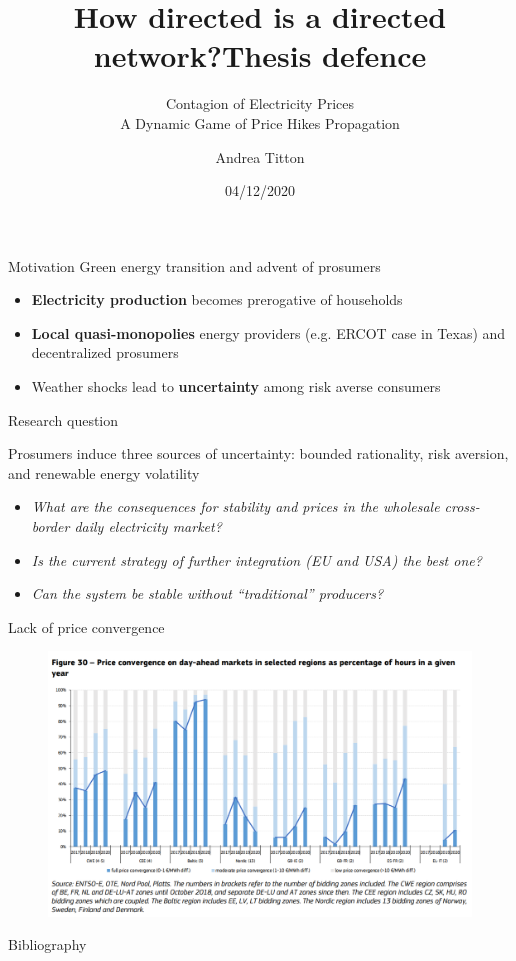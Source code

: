 \documentclass{beamer}
\title{How directed is a directed network?}
\author{Andrea Titton}
\title{Thesis defence}
\subtitle{Contagion of Electricity Prices \\ A Dynamic Game of Price Hikes Propagation}
\institute{Tinbergen Institute}
\date{04/12/2020}
\begin{document}
\frame{\titlepage}

\begin{frame}{Motivation}
    Green energy transition and advent of prosumers
    \vspace{2em}
    \begin{itemize}\setlength\itemsep{1.5em}
        \item \textbf{Electricity production} becomes prerogative of households
        \item \textbf{Local quasi-monopolies} energy providers (e.g. ERCOT case in Texas) and decentralized prosumers
        \item Weather shocks lead to \textbf{uncertainty} among risk averse consumers
    \end{itemize}
\end{frame}

\begin{frame}{Research question}

    Prosumers induce three sources of uncertainty: bounded rationality, risk aversion, and renewable energy volatility

    \begin{itemize} \setlength{\itemsep}{1em}
        \item \textit{What are the consequences for stability and prices in the wholesale cross-border daily electricity market?}
        \item \textit{Is the current strategy of further integration (EU and USA) the best one?}
        \item \textit{Can the system be stable without ``traditional'' producers?}
    \end{itemize}

\end{frame}

\begin{frame}{Lack of price convergence}
    \begin{figure}
        \includegraphics[height = 0.7\textheight]{figures/convergence.PNG}
        \caption{\cite{Report2019}}
    \end{figure}
\end{frame}

\begin{frame}[allowframebreaks]{Bibliography}
    \printbibliography
\end{frame}
\end{document}
